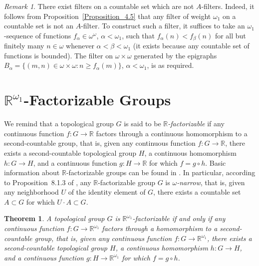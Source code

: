 \documentclass[a4paper,12pt]{amsart}
\newtheorem{theorem}{Theorem}[section]
\theoremstyle{definition}
\theoremstyle{remark}
\newtheorem{remark}{Remark}[section]
\begin{document}
\begin{remark}
\label{Remark_4.1}
There exist filters on a countable set which are not $A$-filters.
Indeed, it follows from Proposition~\ref{Proposition_4.5} that any filter of weight $\omega_1$ on a 
countable set is not an $A$-filter. To construct such a filter, it suffices to take an $\omega_1$-sequence of 
functions $f_\alpha\in \omega^\omega$, $\alpha<\omega_1$, such that 
$f_\alpha(n)<f_\beta(n)$  for all but finitely many $n\in \omega$ whenever $\alpha<\beta<\omega_1$ (it 
exists because any countable set of functions is bounded). The filter on $\omega\times \omega$ generated by the 
epigraphs $B_\alpha=\{(m,n)\in \omega\times \omega:  n\ge f_\alpha(m)\}$, $\alpha<\omega_1$, is as required.  
\end{remark}

\section{$\mathbb R^{\omega_1}$-Factorizable Groups}

We remind that a topological group $G$ is said to be \emph{$\mathbb R$-factorizable} if any continuous function  
$f\colon G\to \mathbb R$ factors through a continuous homomorphism to a second-countable group, 
that is, given any continuous function $f\colon G\to \mathbb R$, there exists 
a second-countable topological group $H$, a continuous homomorphism $h\colon G \to H$, and a continuous function 
$g\colon H\to \mathbb R$ for which $f = g \circ h$. Basic information about $\mathbb R$-factorizable groups can 
be found in \cite{A-T}. In particular, according to Proposition~8.1.3 of \cite{A-T}, any $\mathbb R$-factorizable 
group $G$ is \emph{$\omega$-narrow}, that is, given any neighborhood $U$ of the identity element of $G$, there 
exists a countable set $A\subset G$ for which $U\cdot A\subset G$. 

\begin{theorem}
\label{Theorem_5.1}
A topological group $G$ is $\mathbb R^{\omega_1}$-factorizable if and only if any continuous function  
$f\colon G\to \mathbb R^{\omega_1}$ factors through a homomorphism to a second-countable group, that is, given 
any continuous function $f\colon G\to \mathbb R^{\omega_1}$, there exists a second-countable topological group 
$H$, a continuous homomorphism $h\colon G \to H$, and a continuous function $g\colon H\to \mathbb R^{\omega_1}$ 
for which $f = g \circ h$. 
\end{theorem} 
\end{document}
